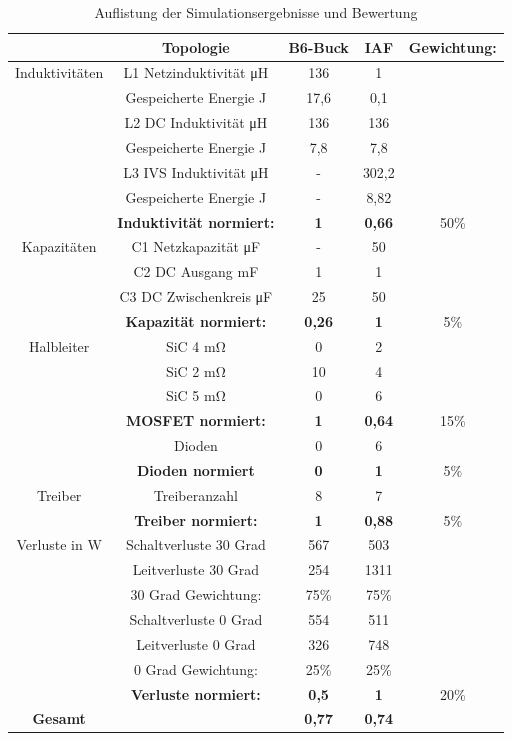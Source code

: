 \begin{table}
	\centering
	\caption{Auflistung der Simulationsergebnisse und Bewertung}
	\begin{tabular}{c|c|c|c|c}
		& Topologie & B6-Buck & \gls{IAF} & Gewichtung: \\
		\hline
		Induktivitäten& L1 Netzinduktivität \si{\micro \henry}& 136 & 1 &  \\
		\hline
		& Gespeicherte Energie J& 17,6 & 0,1 & \\
		\hline
		& L2 DC Induktivität \si{\micro \henry}& 136 & 136 &  \\
		\hline
		& Gespeicherte Energie J& 7,8 & 7,8 &  \\
		\hline
		& L3 IVS Induktivität \si{\micro \henry}& - & 302,2 &  \\
		\hline
		& Gespeicherte Energie J & - & 8,82 & \\
		\hline
		& \textbf{Induktivität normiert:} & \textbf{1}   & \textbf{0,66} & 50\% \\
		\hline
		Kapazitäten & C1 Netzkapazität \si{\micro \farad}& - & 50 &  \\
		\hline
		& C2 DC Ausgang mF& 1 & 1 &  \\
		\hline
		& C3 DC Zwischenkreis \si{\micro \farad}& 25 & 50 &  \\
		\hline
		& \textbf{Kapazität normiert:} & \textbf{0,26} &  \textbf{1} & 5\% \\
		\hline
		Halbleiter & SiC 4 \si{\milli \ohm} & 0 & 2 &  \\
		\hline
		& SiC 2 \si{\milli \ohm} & 10 & 4 &  \\
		\hline
		& SiC 5 \si{\milli \ohm} & 0 & 6 &  \\
		\hline
		& \textbf{MOSFET normiert:} & \textbf{1} &  \textbf{0,64} & 15\% \\
		\hline
		& Dioden & 0 & 6 &  \\
		\hline
		& \textbf{Dioden normiert} & \textbf{0} & \textbf{1} & 5\% \\
		\hline
		Treiber & Treiberanzahl & 8 & 7 &  \\
		\hline
		& \textbf{Treiber normiert:} & \textbf{1} & \textbf{0,88} & 5\% \\
		\hline
		Verluste in W & Schaltverluste 30 Grad & 567 & 503 &  \\
		\hline
		& Leitverluste 30 Grad & 254 & 1311 &  \\
		\hline
		& 30 Grad Gewichtung: & 75\% & 75\% &  \\
		\hline
		& Schaltverluste 0 Grad & 554 & 511 &  \\
		\hline
		& Leitverluste 0 Grad & 326 & 748 &  \\
		\hline
		& 0 Grad Gewichtung: & 25\% & 25\% &  \\
		\hline
		& \textbf{Verluste normiert:} &\textbf{0,5} & \textbf{1} & 20\% \\
		\hline
		\textbf{Gesamt} &  & \textbf{0,77} & \textbf{0,74} & \\
	\end{tabular}
	\label{tab:Auswertung}
\end{table}